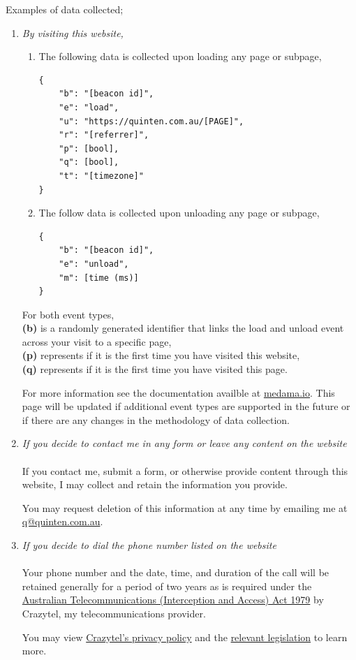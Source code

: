 \documentclass{article}
\begin{document}
Examples of data collected;
\begin{enumerate}
\item \textit{By visiting this website,} \\

\begin{enumerate}
\item The following data is collected upon loading any page or subpage,
\begin{verbatim}
{
	"b": "[beacon id]",
	"e": "load",
	"u": "https://quinten.com.au/[PAGE]",
	"r": "[referrer]",
	"p": [bool],
	"q": [bool],
	"t": "[timezone]"
}
\end{verbatim}

\item The follow data is collected upon unloading any page or subpage,
\begin{verbatim}
{
	"b": "[beacon id]",
	"e": "unload",
	"m": [time (ms)]
}
\end{verbatim}

\end{enumerate}

For both event types, \\
\textbf{(b)} is a randomly generated identifier that links the load and unload event across your visit to a specific page, \\
\textbf{(p)} represents if it is the first time you have visited this website, \\
\textbf{(q)} represents if it is the first time you have visited this page.

For more information see the documentation availble at \href{https://medama.io}{medama.io}. This page will be updated if additional event
types are supported in the future or if there are any changes in the methodology of data collection.

\item \textit{If you decide to contact me in any form or leave any content on the website} \\ \\
If you contact me, submit a form, or otherwise provide content through this website, I may collect 
and retain the information you provide.

You may request deletion of this information at any time by emailing me at \href{mailto:q@quinten.com.au}{q@quinten.com.au}.

\item \textit{If you decide to dial the phone number listed on the website} \\ \\
Your phone number and the date, time, and duration of the call will be retained generally for a period of two years as is required 
under the \href{https://www.legislation.gov.au/C2004A02124}{Australian Telecommunications (Interception and Access) Act 1979} by Crazytel, 
my telecommunications provider.

You may view \href{https://crazytel.com.au/legal/privacypolicy/}{Crazytel's privacy policy} and 
the \href{https://www.legislation.gov.au/C2004A02124}{relevant legislation} to learn more.

\end{enumerate}
\end{document}
